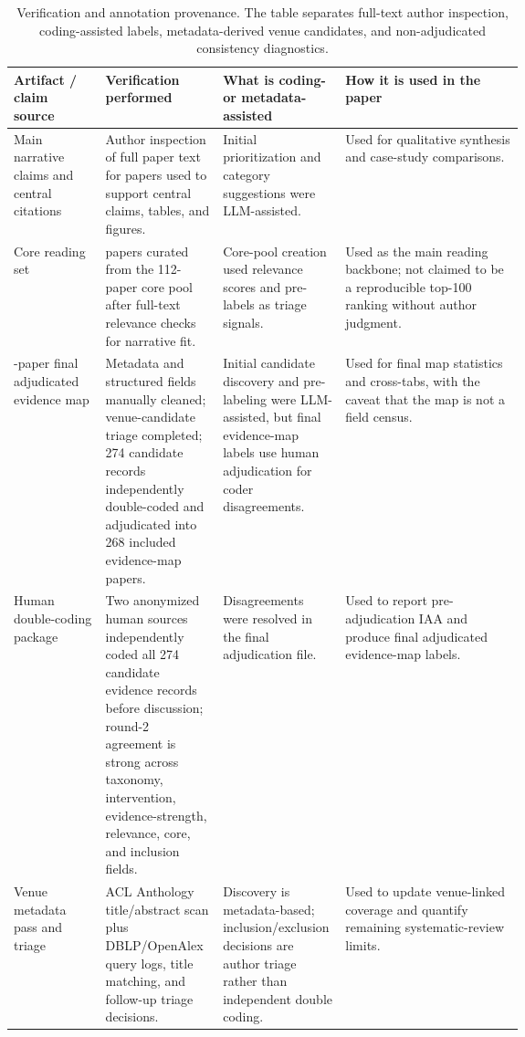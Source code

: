 \begin{table}[t]
\centering
\scriptsize
\renewcommand{\arraystretch}{0.94}
\begin{tabularx}{\linewidth}{>{\raggedright\arraybackslash}p{0.18\linewidth}>{\raggedright\arraybackslash}p{0.23\linewidth}>{\raggedright\arraybackslash}p{0.24\linewidth}X}
\toprule
\textbf{Artifact / claim source} & \textbf{Verification performed} & \textbf{What is coding- or metadata-assisted} & \textbf{How it is used in the paper} \\
\midrule
Main narrative claims and central citations & Author inspection of full paper text for papers used to support central claims, tables, and figures. & Initial prioritization and category suggestions were LLM-assisted. & Used for qualitative synthesis and case-study comparisons. \\
Core reading set & 100 papers curated from the 112-paper core pool after full-text relevance checks for narrative fit. & Core-pool creation used relevance scores and pre-labels as triage signals. & Used as the main reading backbone; not claimed to be a reproducible top-100 ranking without author judgment. \\
268-paper final adjudicated evidence map & Metadata and structured fields manually cleaned; venue-candidate triage completed; 274 candidate records independently double-coded and adjudicated into 268 included evidence-map papers. & Initial candidate discovery and pre-labeling were LLM-assisted, but final evidence-map labels use human adjudication for coder disagreements. & Used for final map statistics and cross-tabs, with the caveat that the map is not a field census. \\
Human double-coding package & Two anonymized human sources independently coded all 274 candidate evidence records before discussion; round-2 agreement is strong across taxonomy, intervention, evidence-strength, relevance, core, and inclusion fields. & Disagreements were resolved in the final adjudication file. & Used to report pre-adjudication IAA and produce final adjudicated evidence-map labels. \\
Venue metadata pass and triage & ACL Anthology title/abstract scan plus DBLP/OpenAlex query logs, title matching, and follow-up triage decisions. & Discovery is metadata-based; inclusion/exclusion decisions are author triage rather than independent double coding. & Used to update venue-linked coverage and quantify remaining systematic-review limits. \\
\bottomrule
\end{tabularx}
\caption{Verification and annotation provenance. The table separates full-text author inspection, coding-assisted labels, metadata-derived venue candidates, and non-adjudicated consistency diagnostics.}
\label{tab:verification-provenance}
\end{table}
